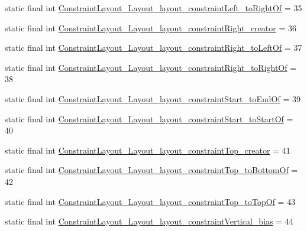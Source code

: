 \begin{DoxyCompactItemize}
\item 
static final int \mbox{\hyperlink{classandroid_1_1support_1_1constraint_1_1_r_1_1styleable_a995a9a19a8260e505d7fed114338fdba}{Constraint\+Layout\+\_\+\+Layout\+\_\+layout\+\_\+constraint\+Left\+\_\+to\+Right\+Of}} = 35
\item 
static final int \mbox{\hyperlink{classandroid_1_1support_1_1constraint_1_1_r_1_1styleable_aff97e3e343064ece1e4070c2d2d11ee2}{Constraint\+Layout\+\_\+\+Layout\+\_\+layout\+\_\+constraint\+Right\+\_\+creator}} = 36
\item 
static final int \mbox{\hyperlink{classandroid_1_1support_1_1constraint_1_1_r_1_1styleable_a0b08809a206ee9b0b7c4b63901aa402b}{Constraint\+Layout\+\_\+\+Layout\+\_\+layout\+\_\+constraint\+Right\+\_\+to\+Left\+Of}} = 37
\item 
static final int \mbox{\hyperlink{classandroid_1_1support_1_1constraint_1_1_r_1_1styleable_ab52d8b77898c02fdb3d0f1a23c92e586}{Constraint\+Layout\+\_\+\+Layout\+\_\+layout\+\_\+constraint\+Right\+\_\+to\+Right\+Of}} = 38
\item 
static final int \mbox{\hyperlink{classandroid_1_1support_1_1constraint_1_1_r_1_1styleable_af7db8d13ff13f117fc8893c3db46ea7c}{Constraint\+Layout\+\_\+\+Layout\+\_\+layout\+\_\+constraint\+Start\+\_\+to\+End\+Of}} = 39
\item 
static final int \mbox{\hyperlink{classandroid_1_1support_1_1constraint_1_1_r_1_1styleable_aa85769983cb73acd4746b134d3d495bc}{Constraint\+Layout\+\_\+\+Layout\+\_\+layout\+\_\+constraint\+Start\+\_\+to\+Start\+Of}} = 40
\item 
static final int \mbox{\hyperlink{classandroid_1_1support_1_1constraint_1_1_r_1_1styleable_a4bd718b50f6aec4f1d229bb10898ff08}{Constraint\+Layout\+\_\+\+Layout\+\_\+layout\+\_\+constraint\+Top\+\_\+creator}} = 41
\item 
static final int \mbox{\hyperlink{classandroid_1_1support_1_1constraint_1_1_r_1_1styleable_a805ecc66fe3499b9e077691208ca4e16}{Constraint\+Layout\+\_\+\+Layout\+\_\+layout\+\_\+constraint\+Top\+\_\+to\+Bottom\+Of}} = 42
\item 
static final int \mbox{\hyperlink{classandroid_1_1support_1_1constraint_1_1_r_1_1styleable_a37a8c94b6aaf49b9df53c61543035fa5}{Constraint\+Layout\+\_\+\+Layout\+\_\+layout\+\_\+constraint\+Top\+\_\+to\+Top\+Of}} = 43
\item 
static final int \mbox{\hyperlink{classandroid_1_1support_1_1constraint_1_1_r_1_1styleable_a3266cec39eab4572274a0d18442a18ca}{Constraint\+Layout\+\_\+\+Layout\+\_\+layout\+\_\+constraint\+Vertical\+\_\+bias}} = 44

\end{DoxyCompactItemize}
